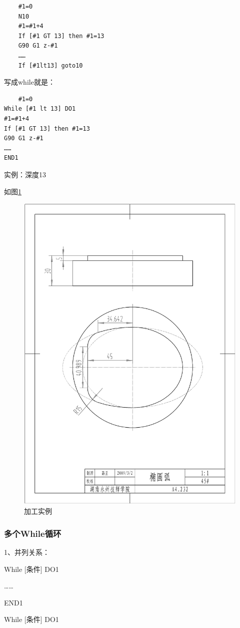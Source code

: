 \begin{lstlisting}
	#1=0
	N10 
	#1=#1+4
	If [#1 GT 13] then #1=13
	G90 G1 z-#1
	……
	If [#1lt13] goto10
\end{lstlisting}

	写成while就是：

\begin{lstlisting}
	#1=0
While [#1 lt 13] DO1
#1=#1+4
If [#1 GT 13] then #1=13
G90 G1 z-#1
……
END1
\end{lstlisting}


	实例：深度13
	
	如图\ref{fig:34-1}

\begin{figure}[h]
	\centering
	\includegraphics[width=0.7\linewidth,trim=50 150 50 100,clip]{data/image/34-1}
	\caption{加工实例}
	\label{fig:34-1}
\end{figure}
	

\subsubsection{多个While循环}  
	1、并列关系：
	
	While [条件] DO1
	
	……
	
	END1
	
	While [条件] DO1
	

